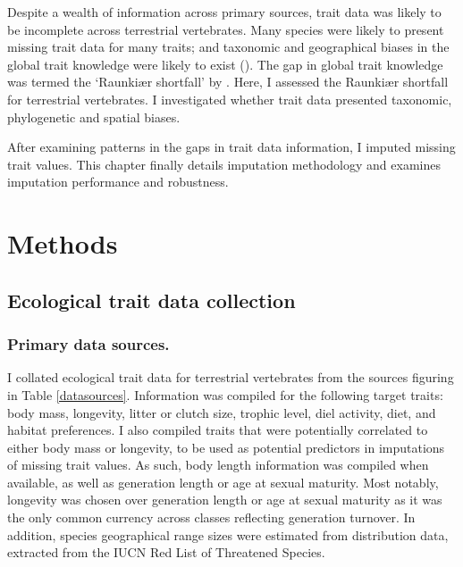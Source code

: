Despite a wealth of information across primary sources, trait data was likely to be incomplete across terrestrial vertebrates. Many species were likely to present missing trait data for many traits; and taxonomic and geographical biases in the global trait knowledge were likely to exist (\cite{Hortal2014}). The gap in global trait knowledge was termed the `Raunki{\ae}r shortfall' by \cite{Hortal2014}. Here, I assessed the Raunki{\ae}r shortfall for terrestrial vertebrates. I investigated whether trait data presented taxonomic, phylogenetic and spatial biases.  

After examining patterns in the gaps in trait data information, I imputed missing trait values. This chapter finally details imputation methodology and examines imputation performance and robustness.



\section{Methods}

\subsection{Ecological trait data collection}

\subsubsection{Primary data sources.}
I collated ecological trait data for terrestrial vertebrates from the sources figuring in Table \ref{datasources}. Information was compiled for the following target traits: body mass, longevity, litter or clutch size, trophic level, diel activity, diet, and habitat preferences. I also compiled traits that were potentially correlated to either body mass or longevity, to be used as potential predictors in imputations of missing trait values. As such, body length information was compiled when available, as well as generation length or age at sexual maturity. Most notably, longevity was chosen over generation length or age at sexual maturity as it was the only common currency across classes reflecting generation turnover. In addition, species geographical range sizes were estimated from distribution data, extracted from the IUCN Red List of Threatened Species.

